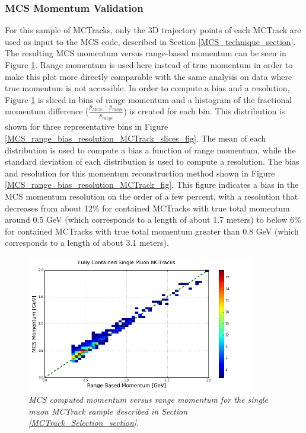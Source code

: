 \subsubsection{MCS Momentum Validation}\label{MCS_Momentum_Validation_MCTrack_section}
For this sample of {\sc MCTracks}, only the 3D trajectory points of each {\sc MCTrack} are used as input to the MCS code, described in Section \ref{MCS_technique_section}. The resulting MCS momentum versus range-based momentum can be seen in Figure \ref{MCS_range_momentum_MCTrack_fig}. Range momentum is used here instead of true momentum in order to make this plot more directly comparable with the same analysis on data where true momentum is not accessible. In order to compute a bias and a resolution, Figure \ref{MCS_range_momentum_MCTrack_fig} is sliced in bins of range momentum and a histogram of the fractional momentum difference ($\frac{p_{MCS} - p_{range}}{p_{range}}$) is created for each bin. This distribution is shown for three representative bins in Figure \ref{MCS_range_bias_resolution_MCTrack_slices_fig}. The mean of each distribution is used to compute a bias a function of range momentum, while the standard deviation of each distribution is used to compute a resolution. The bias and resolution for this momentum reconstruction method shown in Figure \ref{MCS_range_bias_resolution_MCTrack_fig}. This figure indicates a bias in the MCS momentum resolution on the order of a few percent, with a resolution that decreases from about 12\% for contained {\sc MCTracks} with true total momentum around 0.5 GeV (which corresponds to a length of about 1.7 meters) to below 6\% for contained {\sc MCTracks} with true total momentum greater than 0.8 GeV (which corresponds to a length of about 3.1 meters).


\begin{figure}[h!]
\begin{center}
\includegraphics[width=100mm]{Figures/MCS_range_comparison_SingleMuonMCTrack.png}
\end{center}
\caption{\textit{MCS computed momentum versus range momentum for the single muon {\sc MCTrack} sample described in Section \ref{MCTrack_Selection_section}.}}
\label{MCS_range_momentum_MCTrack_fig}
\end{figure}

